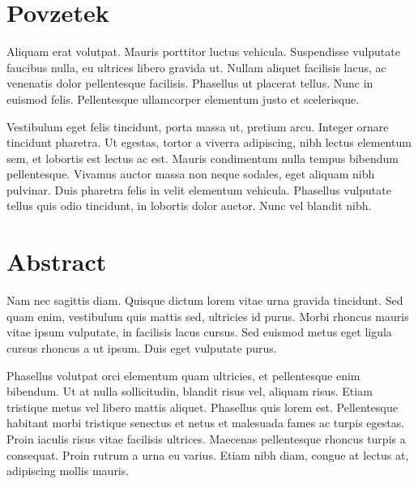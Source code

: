 \documentclass[a4paper, 12pt, twoside]{book}
\newcommand{\clearemptydoublepage}{\newpage{\pagestyle{empty}\cleardoublepage}} %
\begin{document}
\clearemptydoublepage

\chapter*{Povzetek}
Aliquam erat volutpat. Mauris porttitor luctus vehicula. Suspendisse vulputate faucibus nulla, eu ultrices libero gravida ut. Nullam aliquet facilisis lacus, ac venenatis dolor pellentesque facilisis. Phasellus ut placerat tellus. Nunc in euismod felis. Pellentesque ullamcorper elementum justo et scelerisque.

Vestibulum eget felis tincidunt, porta massa ut, pretium arcu. Integer ornare tincidunt pharetra. Ut egestas, tortor a viverra adipiscing, nibh lectus elementum sem, et lobortis est lectus ac est. Mauris condimentum nulla tempus bibendum pellentesque. Vivamus auctor massa non neque sodales, eget aliquam nibh pulvinar. Duis pharetra felis in velit elementum vehicula. Phasellus vulputate tellus quis odio tincidunt, in lobortis dolor auctor. Nunc vel blandit nibh.

\clearemptydoublepage

\chapter*{Abstract}
Nam nec sagittis diam. Quisque dictum lorem vitae urna gravida tincidunt. Sed quam enim, vestibulum quis mattis sed, ultricies id purus. Morbi rhoncus mauris vitae ipsum vulputate, in facilisis lacus cursus. Sed euismod metus eget ligula cursus rhoncus a ut ipsum. Duis eget vulputate purus.

Phasellus volutpat orci elementum quam ultricies, et pellentesque enim bibendum. Ut at nulla sollicitudin, blandit risus vel, aliquam risus. Etiam tristique metus vel libero mattis aliquet. Phasellus quis lorem est. Pellentesque habitant morbi tristique senectus et netus et malesuada fames ac turpis egestas. Proin iaculis risus vitae facilisis ultrices. Maecenas pellentesque rhoncus turpis a consequat. Proin rutrum a urna eu varius. Etiam nibh diam, congue at lectus at, adipiscing mollis mauris.

\clearemptydoublepage

\mainmatter
\setcounter{page}{1}
\end{document}
